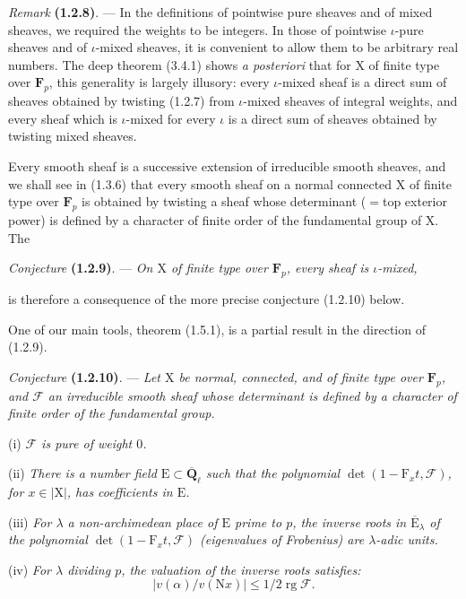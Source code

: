 \documentclass[11pt,leqno]{article}
\begin{document}
\textit{Remark} \textbf{(1.2.8)}. — In the definitions of pointwise pure sheaves and of mixed sheaves, we required the weights to be integers. In those of pointwise \(\iota\)-pure sheaves and of \(\iota\)-mixed sheaves, it is convenient to allow them to be arbitrary real numbers. The deep theorem (3.4.1) shows \textit{a posteriori} that for \(\mathrm{X}\) of finite type over \(\mathbf{F}_p\), this generality is largely illusory: every \(\iota\)-mixed sheaf is a direct sum of sheaves obtained by twisting (1.2.7) from \(\iota\)-mixed sheaves of integral weights, and every sheaf which is \(\iota\)-mixed for every \(\iota\) is a direct sum of sheaves obtained by twisting mixed sheaves.

Every smooth sheaf is a successive extension of irreducible smooth sheaves, and we shall see in (1.3.6) that every smooth sheaf on a normal connected \(\mathrm{X}\) of finite type over \(\mathbf{F}_p\) is obtained by twisting a sheaf whose determinant (\(=\)top exterior power) is defined by a character of finite order of the fundamental group of \(\mathrm{X}\). The

\textit{Conjecture} \textbf{(1.2.9)}. — \textit{On \(\mathrm{X}\) of finite type over \(\mathbf{F}_p\), every sheaf is \(\iota\)-mixed,}

\noindent is therefore a consequence of the more precise conjecture (1.2.10) below.

One of our main tools, theorem (1.5.1), is a partial result in the direction of (1.2.9).

\textit{Conjecture} \textbf{(1.2.10)}. — \textit{Let \(\mathrm{X}\) be normal, connected, and of finite type over \(\mathbf{F}_p\), and \(\mathscr{F}\) an irreducible smooth sheaf whose determinant is defined by a character of finite order of the fundamental group.}

(i) \textit{\(\mathscr{F}\) is pure of weight \(0\).}

(ii) \textit{There is a number field \(\mathrm{E}\subset\overline{\mathbf{Q}}_\ell\) such that the polynomial \(\det(1-\mathrm{F}_xt,\mathscr{F})\), for \(x\in|\mathrm{X}|\), has coefficients in \(\mathrm{E}\).}

(iii) \textit{For \(\lambda\) a non-archimedean place of \(\mathrm{E}\) prime to \(p\), the inverse roots in \(\overline{\mathrm{E}}_\lambda\) of the polynomial \(\det(1-\mathrm{F}_xt,\mathscr{F})\) (eigenvalues of Frobenius) are \(\lambda\)-adic units.}

(iv) \textit{For \(\lambda\) dividing \(p\), the valuation of the inverse roots satisfies:}
\[
|v(\alpha)/v(\mathrm{N}x)|\leq1/2\operatorname{rg}\mathscr{F}.
\]
\end{document}
